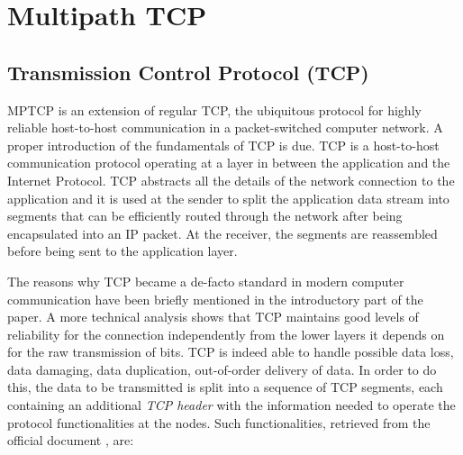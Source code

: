 \chapter{Multipath TCP}
\label{chap:multipathtcp}

\section{Transmission Control Protocol (TCP)}
MPTCP is an extension of regular TCP, the ubiquitous protocol for highly reliable host-to-host communication in a packet-switched computer network. A proper introduction of the fundamentals of TCP is due.
TCP is a host-to-host communication protocol operating at a layer in between the application and the Internet Protocol. TCP abstracts all the details of the network connection to the application and it is used at the sender to split the application data stream into segments that can be efficiently routed through the network after being encapsulated into an IP packet. At the receiver, the segments are reassembled before being sent to the application layer.

The reasons why TCP became a de-facto standard in modern computer communication have been briefly mentioned in the introductory part of the paper. A more technical analysis shows that TCP maintains good levels of reliability for the connection independently from the lower layers it depends on for the raw transmission of bits. TCP is indeed able to handle possible data loss, data damaging, data duplication, out-of-order delivery of data. In order to do this, the data to be transmitted is split into a sequence of TCP segments, each containing an additional \textit{TCP header} with the information needed to operate the protocol functionalities at the nodes. Such functionalities, retrieved from the official document , are:

